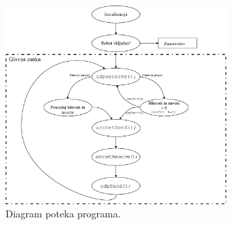 \begin{figure}[!th]
	\centering
	\includegraphics[width=0.75\textwidth]{./Slike/server-flowchart.eps}
	\caption{Diagram poteka programa.}
	\label{fig:server-flowchart}
\end{figure}
